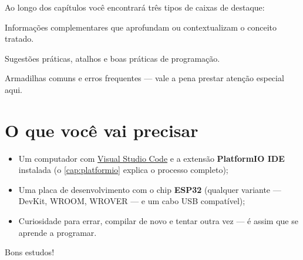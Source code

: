 Ao longo dos capítulos você encontrará três tipos de caixas de destaque:

\begin{nota}
Informações complementares que aprofundam ou contextualizam o conceito tratado.
\end{nota}

\begin{dica}
Sugestões práticas, atalhos e boas práticas de programação.
\end{dica}

\begin{atencao}
Armadilhas comuns e erros frequentes — vale a pena prestar atenção especial aqui.
\end{atencao}

\section*{O que você vai precisar}

\begin{itemize}
    \item Um computador com \href{https://code.visualstudio.com/}{Visual Studio Code} e a extensão \textbf{PlatformIO IDE} instalada (o \cref{cap:platformio} explica o processo completo);
    \item Uma placa de desenvolvimento com o chip \textbf{ESP32} (qualquer variante — DevKit, WROOM, WROVER — e um cabo USB compatível);
    \item Curiosidade para errar, compilar de novo e tentar outra vez — é assim que se aprende a programar.
\end{itemize}

Bons estudos!

\newpage
